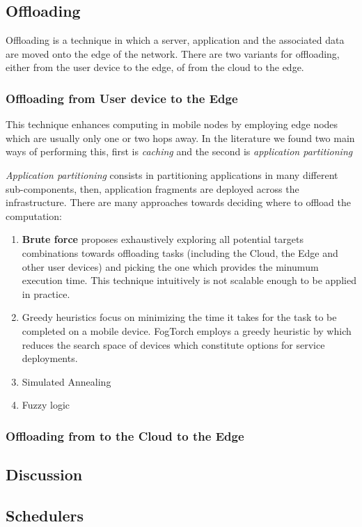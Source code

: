 \subsection{Offloading}

Offloading is a technique in which a server, application and the associated data are moved onto the edge of the network. There are two variants for offloading, either from the user device to the edge, of from the cloud to the edge.

\subsubsection{Offloading from User device to the Edge}

This technique enhances computing in  mobile nodes by employing edge nodes which are usually only one or two hops away. In the literature we found two main ways of performing this, first is \textit{caching} and the second is \textit{application partitioning}

\textit{Application partitioning} consists in partitioning applications in many different sub-components, then, application fragments are deployed across the infrastructure. There are many approaches towards deciding where to offload the computation:

\begin{enumerate}
    \item \textbf{Brute force} proposes exhaustively exploring all potential targets combinations towards offloading tasks (including the Cloud, the Edge and other user devices) and picking the one which provides the minumum execution time. This technique intuitively is not scalable enough to be applied in practice.
    
    \item Greedy heuristics focus on minimizing the time it takes for the task to be completed on a mobile device. FogTorch \cite{Brogi2017} employs a greedy heuristic by which reduces the search space of devices which constitute options for service deployments.

    \item Simulated Annealing
    \item Fuzzy logic
\end{enumerate}

\subsubsection{Offloading from to the Cloud to the Edge}

\subsection{Discussion}

\subsection{Schedulers}